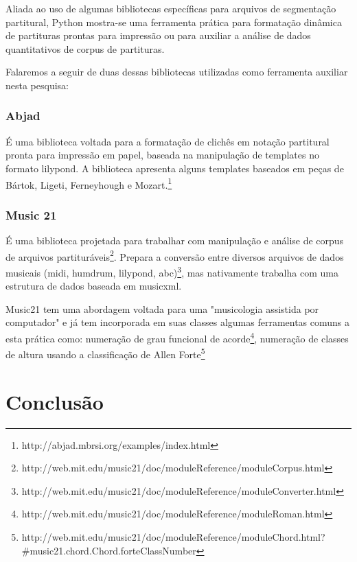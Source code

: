 \documentclass[
	12pt,				%
	openright,			%
	twoside,			%
	a4paper,			%
	english,			%
	french,				%
	spanish,			%
	brazil				%
	]{abntex2}
\begin{document}
Aliada ao uso de algumas bibliotecas específicas para arquivos de segmentação partitural, Python mostra-se uma ferramenta prática para formatação dinâmica de partituras prontas para impressão ou para auxiliar a análise de dados quantitativos de corpus de partituras.

Falaremos a seguir de duas dessas bibliotecas utilizadas como ferramenta auxiliar nesta pesquisa:


\subsection{Abjad}

É uma biblioteca voltada para a formatação de clichês em notação partitural pronta para impressão em papel, baseada na manipulação de templates no formato lilypond. A biblioteca apresenta alguns templates baseados em peças de Bártok, Ligeti, Ferneyhough e Mozart.\footnote{http://abjad.mbrsi.org/examples/index.html}



\subsection{Music 21}

É uma biblioteca projetada para trabalhar com manipulação e análise de corpus de arquivos partituráveis\footnote{http://web.mit.edu/music21/doc/moduleReference/moduleCorpus.html}. Prepara a conversão entre diversos arquivos de dados musicais (midi, humdrum, lilypond, abc)\footnote{http://web.mit.edu/music21/doc/moduleReference/moduleConverter.html}, mas nativamente trabalha com uma estrutura de dados baseada em musicxml.

Music21 tem uma abordagem voltada para uma "musicologia assistida por computador" e já tem incorporada em suas classes algumas ferramentas comuns a esta prática como: numeração de grau funcional de acorde\footnote{http://web.mit.edu/music21/doc/moduleReference/moduleRoman.html}, numeração de classes de altura usando a classificação de Allen Forte\footnote{http://web.mit.edu/music21/doc/moduleReference/moduleChord.html?\#music21.chord.Chord.forteClassNumber}






\chapter*[Conclusão]{Conclusão}
\label{conclusao}
\end{document}
